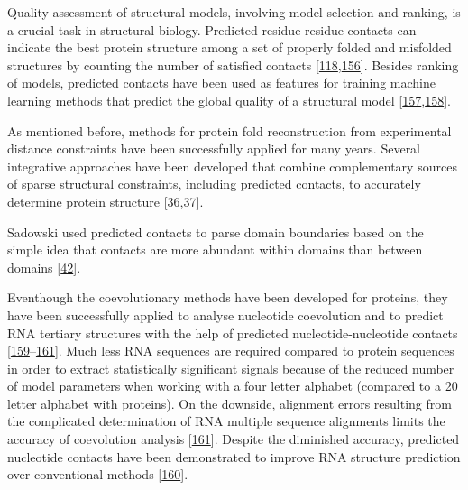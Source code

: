 \documentclass[11pt,a4paper,twoside]{book}
\theoremstyle{definition}
\theoremstyle{definition}
\theoremstyle{remark}
\begin{document}
Quality assessment of structural models, involving model selection and
ranking, is a crucial task in structural biology. Predicted
residue-residue contacts can indicate the best protein structure among a
set of properly folded and misfolded structures by counting the number
of satisfied contacts
{[}\protect\hyperlink{ref-Tress2010}{118},\protect\hyperlink{ref-Wozniak2017}{156}{]}.
Besides ranking of models, predicted contacts have been used as features
for training machine learning methods that predict the global quality of
a structural model
{[}\protect\hyperlink{ref-Cao2016}{157},\protect\hyperlink{ref-Terashi2014a}{158}{]}.

As mentioned before, methods for protein fold reconstruction from
experimental distance constraints have been successfully applied for
many years. Several integrative approaches have been developed that
combine complementary sources of sparse structural constraints,
including predicted contacts, to accurately determine protein structure
{[}\protect\hyperlink{ref-Ward2013}{36},\protect\hyperlink{ref-Tang2015}{37}{]}.

Sadowski used predicted contacts to parse domain boundaries based on the
simple idea that contacts are more abundant within domains than between
domains {[}\protect\hyperlink{ref-Sadowski2013}{42}{]}.

Eventhough the coevolutionary methods have been developed for proteins,
they have been successfully applied to analyse nucleotide coevolution
and to predict RNA tertiary structures with the help of predicted
nucleotide-nucleotide contacts
{[}\protect\hyperlink{ref-Nawy2016}{159}--\protect\hyperlink{ref-DeLeonardis2015a}{161}{]}.
Much less RNA sequences are required compared to protein sequences in
order to extract statistically significant signals because of the
reduced number of model parameters when working with a four letter
alphabet (compared to a 20 letter alphabet with proteins). On the
downside, alignment errors resulting from the complicated determination
of RNA multiple sequence alignments limits the accuracy of coevolution
analysis {[}\protect\hyperlink{ref-DeLeonardis2015a}{161}{]}. Despite
the diminished accuracy, predicted nucleotide contacts have been
demonstrated to improve RNA structure prediction over conventional
methods {[}\protect\hyperlink{ref-Weinreb2015}{160}{]}.
\end{document}
